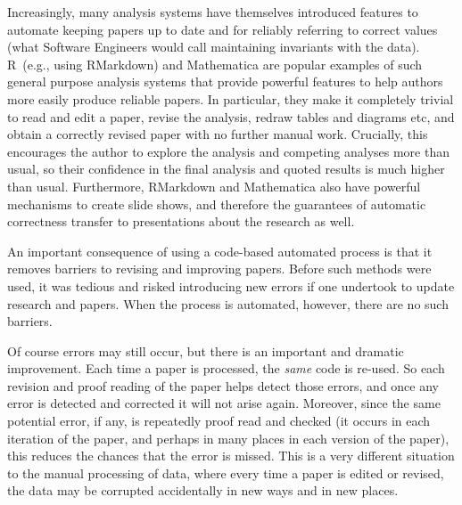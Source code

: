 \begin{change}
Increasingly, many analysis systems have themselves introduced features to automate keeping papers up to date and for reliably referring to correct values (what Software Engineers would call maintaining invariants with the data). R~(e.g., using RMarkdown) and Mathematica are popular examples of such general purpose analysis systems that provide powerful features to help authors more easily produce reliable papers. In particular, they make it completely trivial to read and edit a paper, revise the analysis, redraw tables and diagrams etc, and obtain a correctly revised paper with no further manual work. Crucially, this encourages the author to explore the analysis and competing analyses more than usual, so their confidence in the final analysis and quoted results is much higher than usual. Furthermore, RMarkdown and Mathematica also have powerful mechanisms to create slide shows, and therefore the guarantees of automatic correctness transfer to presentations about the research as well.

An important consequence of using a code-based automated process is that it removes barriers to revising and improving papers. Before such methods were used, it was tedious and risked introducing new errors if one undertook to update research and papers. When the process is automated, however, there are no such barriers.

Of course errors may still occur, but there is an important and dramatic improvement. Each time a paper is processed, the \emph{same\/} code is re-used. So each revision and proof reading of the paper helps detect those errors, and once any error is detected and corrected it will not arise again. Moreover, since the same potential error, if any, is repeatedly proof read and checked (it occurs in each iteration of the paper, and perhaps in many places in each version of the paper), this reduces the chances that the error is missed. This is a very different situation to the manual processing of data, where every time a paper is edited or revised, the data may be corrupted accidentally in new ways and in new places.


\end{change}
